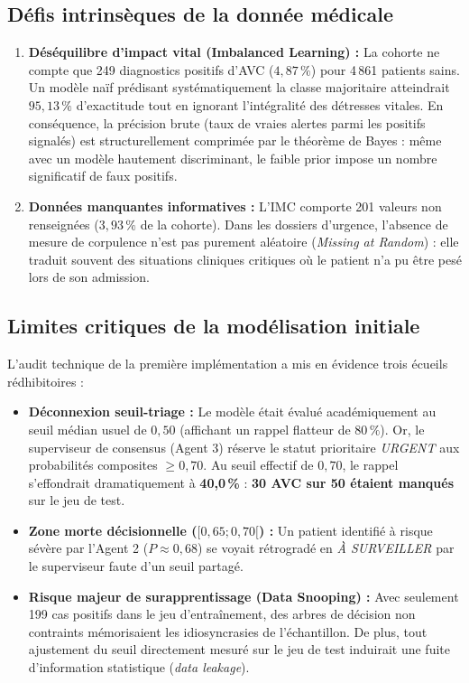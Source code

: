 \documentclass[11pt,a4paper]{article}
\begin{document}
\subsection{Défis intrinsèques de la donnée médicale}
\begin{enumerate}[label=\textbf{\arabic*.}]
    \item \textbf{Déséquilibre d'impact vital (Imbalanced Learning) :} La cohorte ne compte que 249 diagnostics positifs d'AVC ($4{,}87\,\%$) pour 4\,861 patients sains. Un modèle naïf prédisant systématiquement la classe majoritaire atteindrait $95{,}13\,\%$ d'exactitude tout en ignorant l'intégralité des détresses vitales. En conséquence, la précision brute (taux de vraies alertes parmi les positifs signalés) est structurellement comprimée par le théorème de Bayes : même avec un modèle hautement discriminant, le faible prior impose un nombre significatif de faux positifs.
    \item \textbf{Données manquantes informatives :} L'IMC comporte 201 valeurs non renseignées ($3{,}93\,\%$ de la cohorte). Dans les dossiers d'urgence, l'absence de mesure de corpulence n'est pas purement aléatoire (\emph{Missing at Random}) : elle traduit souvent des situations cliniques critiques où le patient n'a pu être pesé lors de son admission.
\end{enumerate}

\subsection{Limites critiques de la modélisation initiale}
L'audit technique de la première implémentation a mis en évidence trois écueils rédhibitoires :
\begin{itemize}[leftmargin=*, label=\color{alertred}]
    \item \textbf{Déconnexion seuil-triage :} Le modèle était évalué académiquement au seuil médian usuel de $0{,}50$ (affichant un rappel flatteur de $80\,\%$). Or, le superviseur de consensus (Agent 3) réserve le statut prioritaire \emph{URGENT} aux probabilités composites $\ge 0{,}70$. Au seuil effectif de $0{,}70$, le rappel s'effondrait dramatiquement à \textbf{40{,}0\,\%} : \textbf{30 AVC sur 50 étaient manqués} sur le jeu de test.
    \item \textbf{Zone morte décisionnelle ($[0{,}65 ; 0{,}70[$) :} Un patient identifié à risque sévère par l'Agent 2 ($P \approx 0{,}68$) se voyait rétrogradé en \emph{À SURVEILLER} par le superviseur faute d'un seuil partagé.
    \item \textbf{Risque majeur de surapprentissage (Data Snooping) :} Avec seulement 199 cas positifs dans le jeu d'entraînement, des arbres de décision non contraints mémorisaient les idiosyncrasies de l'échantillon. De plus, tout ajustement du seuil directement mesuré sur le jeu de test induirait une fuite d'information statistique (\emph{data leakage}).
\end{itemize}
\end{document}

